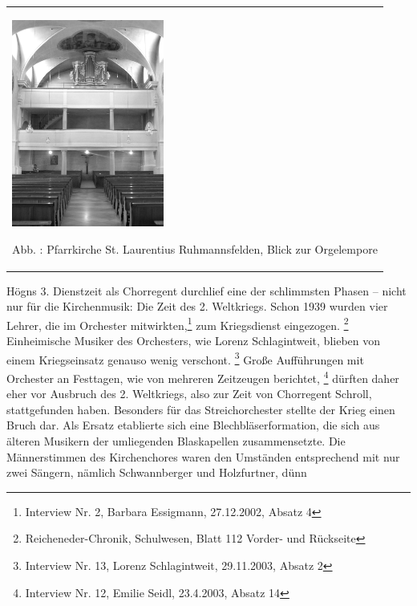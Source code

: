 \documentclass[a4paper]{article}
\newcounter{Abb}
\renewcommand\theAbb{\arabic{Abb}}
\begin{document}
\begin{center}
\begin{minipage}{5.593cm}
\begin{flushleft}
\tablefirsthead{}
\tablehead{}
\tabletail{}
\tablelasttail{}
\begin{supertabular}{m{5.393cm}}

\includegraphics[width=5.001cm,height=6.805cm]{pictures/zulassungsarbeit-img037.jpg}

Abb. \stepcounter{Abb}{\theAbb}: Pfarrkirche St. Laurentius
Ruhmannsfelden, Blick zur Orgelempore\\
\end{supertabular}
\end{flushleft}
\end{minipage}
\end{center}
Högns 3. Dienstzeit als Chorregent durchlief eine der schlimmsten Phasen
– nicht nur für die Kirchenmusik: Die Zeit des 2. Weltkriegs. Schon
1939 wurden vier Lehrer, die im Orchester mitwirkten,\footnote{
Interview Nr. 2, Barbara Essigmann, 27.12.2002, Absatz 4} zum
Kriegsdienst eingezogen. \footnote{Reicheneder-Chronik, Schulwesen,
Blatt 112 Vorder- und Rückseite} Einheimische Musiker des Orchesters,
wie Lorenz Schlagintweit, blieben von einem Kriegseinsatz genauso wenig
verschont. \footnote{Interview Nr. 13, Lorenz Schlagintweit,
29.11.2003, Absatz 2} Große Aufführungen mit Orchester an Festtagen,
wie von mehreren Zeitzeugen berichtet, \footnote{Interview Nr. 12,
Emilie Seidl, 23.4.2003, Absatz 14} dürften daher eher vor Ausbruch des
2. Weltkriegs, also zur Zeit von Chorregent Schroll, stattgefunden
haben. Besonders für das Streichorchester stellte der Krieg einen Bruch
dar. Als Ersatz etablierte sich eine Blechbläserformation, die sich aus
älteren Musikern der umliegenden Blaskapellen zusammensetzte. Die
Männerstimmen des Kirchenchores waren den Umständen entsprechend mit
nur zwei Sängern, nämlich Schwannberger und Holzfurtner, dünn
\end{document}
